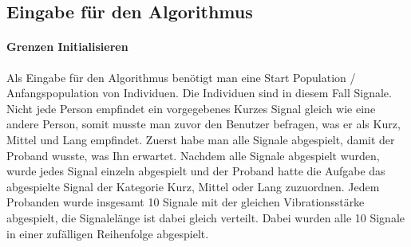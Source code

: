 

\subsection{Eingabe f{\"u}r den Algorithmus}
\paragraph{Grenzen Initialisieren}
Als Eingabe f{\"u}r den Algorithmus ben{\"o}tigt man eine Start Population / Anfangspopulation von Individuen. Die Individuen sind in diesem Fall Signale. 
Nicht jede Person empfindet ein vorgegebenes Kurzes Signal gleich wie eine andere Person, somit musste man zuvor den Benutzer befragen, was er als Kurz, Mittel und Lang empfindet. Zuerst habe man alle Signale abgespielt, damit der Proband wusste, was Ihn erwartet. 
Nachdem alle Signale abgespielt wurden, wurde jedes Signal einzeln abgespielt und der Proband hatte die Aufgabe das abgespielte Signal der Kategorie Kurz, Mittel oder Lang zuzuordnen. 
Jedem Probanden wurde insgesamt 10 Signale mit der gleichen Vibrationsst{\"a}rke abgespielt, die Signalel{\"a}nge ist dabei gleich verteilt.
Dabei wurden alle 10 Signale in einer zuf{\"a}lligen Reihenfolge abgespielt.

